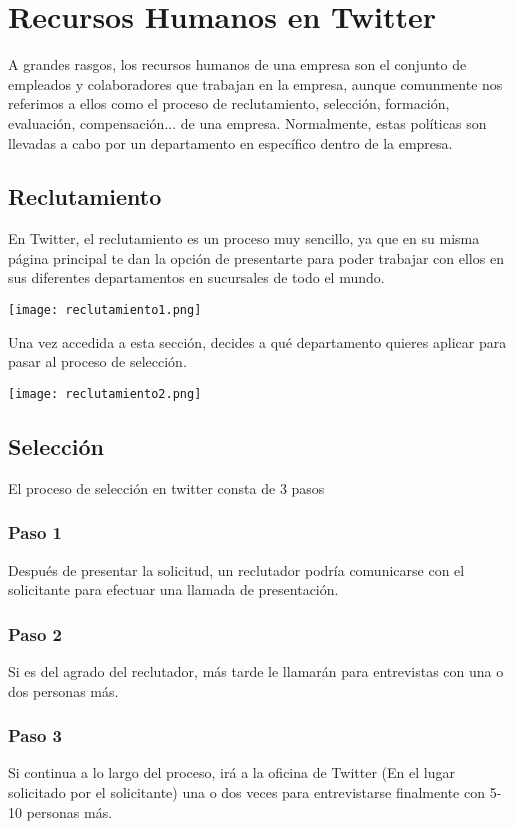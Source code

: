 

\section{Recursos Humanos en Twitter}

A grandes rasgos, los recursos humanos de una empresa son el conjunto de empleados y colaboradores que
trabajan en la empresa, aunque comunmente nos referimos a ellos como el proceso de reclutamiento, selección, formación, evaluación, compensación... de una empresa. Normalmente, estas políticas son llevadas a cabo por un departamento en específico dentro de la empresa.

\subsection{Reclutamiento}

En Twitter, el reclutamiento es un proceso muy sencillo, ya que en su misma página principal te dan la opción de presentarte para poder trabajar con ellos en sus diferentes departamentos en sucursales de todo el mundo.

\texttt{[image: reclutamiento1.png]}
\newpage

Una vez accedida a esta sección, decides a qué departamento quieres aplicar para pasar al proceso de selección.

\texttt{[image: reclutamiento2.png]}

\subsection{Selección}

El proceso de selección en twitter consta de 3 pasos

\subsubsection{Paso 1}
Después de presentar la solicitud, un reclutador podría comunicarse con el solicitante para efectuar una llamada de presentación.

\subsubsection{Paso 2}
Si es del agrado del reclutador, más tarde le llamarán para entrevistas con una o dos personas más.

\subsubsection{Paso 3}
Si continua a lo largo del proceso, irá a la oficina de Twitter (En el lugar solicitado por el solicitante) una o dos veces para entrevistarse finalmente con 5-10 personas más.